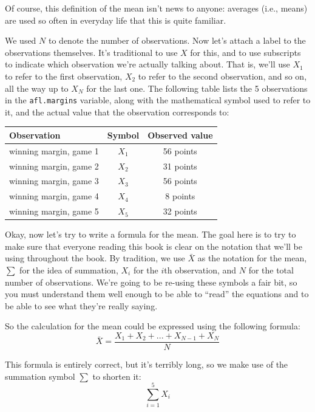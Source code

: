 \documentclass[
  11pt,
]{book}
\theoremstyle{indenteddefinition}
\theoremstyle{indenteddefinition}
\theoremstyle{definition}
\theoremstyle{definition}
\theoremstyle{remark}
\begin{document}
Of course, this definition of the mean isn't news to anyone: averages (i.e., means) are used so often in everyday life that this is quite familiar.

We used \(N\) to denote the number of observations. Now let's attach a label to the observations themselves. It's traditional to use \(X\) for this, and to use subscripts to indicate which observation we're actually talking about. That is, we'll use \(X_1\) to refer to the first observation, \(X_2\) to refer to the second observation, and so on, all the way up to \(X_N\) for the last one. The following table lists the 5 observations in the \texttt{afl.margins} variable, along with the mathematical symbol used to refer to it, and the actual value that the observation corresponds to:

\begin{table}[H]
\centering
\begin{tabular}{l|c|c}
\hline
Observation & Symbol & Observed value\\
\hline
winning margin, game 1 & $X_1$ & 56 points\\
winning margin, game 2 & $X_2$ & 31 points\\
winning margin, game 3 & $X_3$ & 56 points\\
winning margin, game 4 & $X_4$ & 8 points\\
winning margin, game 5 & $X_5$ & 32 points\\
\hline
\end{tabular}
\end{table}

Okay, now let's try to write a formula for the mean. The goal here is to try to make sure that everyone reading this book is clear on the notation that we'll be using throughout the book. By tradition, we use \(\bar{X}\) as the notation for the mean, \(\scriptstyle\sum\) for the idea of summation, \(X_i\) for the \(i\)th observation, and \(N\) for the total number of observations. We're going to be re-using these symbols a fair bit, so you must understand them well enough to be able to ``read'' the equations and to be able to see what they're really saying.

So the calculation for the mean could be expressed using the following formula:
\[
\bar{X} = \frac{X_1 + X_2 + ... + X_{N-1} + X_N}{N}
\]

This formula is entirely correct, but it's terribly long, so we make use of the summation symbol \(\scriptstyle\sum\) to shorten it:
\[
\sum_{i=1}^5 X_i
\]
\end{document}
